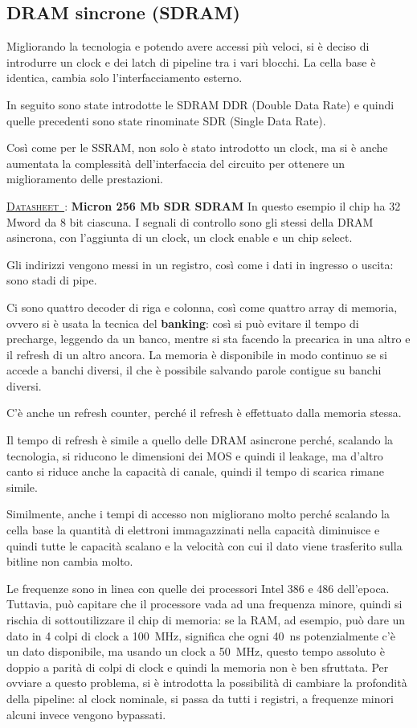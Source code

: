 \documentclass[11pt,4paper]{report}
\newcounter{datasheetcnt}
\renewcommand{\thedatasheetcnt}{\arabic{datasheetcnt}}
\newenvironment{datasheet}[2]{\refstepcounter{datasheetcnt}\par\bigskip\medskip \label{#2}
	\noindent \underline{\textsc{Datasheet~\thedatasheetcnt}}: \textbf{#1} \newline}{\medskip}
\begin{document}
\subsection{DRAM sincrone (SDRAM)}
Migliorando la tecnologia e potendo avere accessi più veloci, si è deciso di introdurre un clock e dei latch di pipeline tra i vari blocchi. La cella base è identica, cambia solo l'interfacciamento esterno.

In seguito sono state introdotte le SDRAM DDR (Double Data Rate) e quindi quelle precedenti sono state rinominate SDR (Single Data Rate).

Così come per le SSRAM, non solo è stato introdotto un clock, ma si è anche aumentata la complessità dell'interfaccia del circuito per ottenere un miglioramento delle prestazioni.

\begin{datasheet}{Micron 256 Mb SDR SDRAM}{}
In questo esempio il chip ha 32 Mword da 8 bit ciascuna. I segnali di controllo sono gli stessi della DRAM asincrona, con l'aggiunta di un clock, un clock enable e un chip select.

Gli indirizzi vengono messi in un registro, così come i dati in ingresso o uscita: sono stadi di pipe.

Ci sono quattro decoder di riga e colonna, così come quattro array di memoria, ovvero si è usata la tecnica del \textbf{banking}: così si può evitare il tempo di precharge, leggendo da un banco, mentre si sta facendo la precarica in una altro e il refresh di un altro ancora. La memoria è disponibile in modo continuo se si accede a banchi diversi, il che è possibile salvando parole contigue su banchi diversi.

C'è anche un refresh counter, perché il refresh è effettuato dalla memoria stessa.

Il tempo di refresh è simile a quello delle DRAM asincrone perché, scalando la tecnologia, si riducono le dimensioni dei MOS e quindi il leakage, ma d'altro canto si riduce anche la capacità di canale, quindi il tempo di scarica rimane simile.

Similmente, anche i tempi di accesso non migliorano molto perché scalando la cella base la quantità di elettroni immagazzinati nella capacità diminuisce e quindi tutte le capacità scalano e la velocità con cui il dato viene trasferito sulla bitline non cambia molto.

Le frequenze sono in linea con quelle dei processori Intel 386 e 486 dell'epoca. Tuttavia, può capitare che il processore vada ad una frequenza minore, quindi si rischia di sottoutilizzare il chip di memoria: se la RAM, ad esempio, può dare un dato in 4 colpi di clock a \SI{100}{\mega\hertz}, significa che ogni \SI{40}{\nano\second} potenzialmente c'è un dato disponibile, ma usando un clock a \SI{50}{\mega\hertz}, questo tempo assoluto è doppio a parità di colpi di clock e quindi la memoria non è ben sfruttata. Per ovviare a questo problema, si è introdotta la possibilità di cambiare la profondità della pipeline: al clock nominale, si passa da tutti i registri, a frequenze minori alcuni invece vengono bypassati. 


\end{datasheet}
\end{document}
